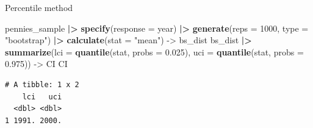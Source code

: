 \documentclass[
  ignorenonframetext,
]{beamer}
\newenvironment{Shaded}{\begin{snugshade}}{\end{snugshade}}
\newcommand{\AttributeTok}[1]{\textcolor[rgb]{0.13,0.29,0.53}{#1}}
\newcommand{\DecValTok}[1]{\textcolor[rgb]{0.00,0.00,0.81}{#1}}
\newcommand{\FloatTok}[1]{\textcolor[rgb]{0.00,0.00,0.81}{#1}}
\newcommand{\FunctionTok}[1]{\textcolor[rgb]{0.13,0.29,0.53}{\textbf{#1}}}
\newcommand{\NormalTok}[1]{#1}
\newcommand{\OtherTok}[1]{\textcolor[rgb]{0.56,0.35,0.01}{#1}}
\newcommand{\SpecialCharTok}[1]{\textcolor[rgb]{0.81,0.36,0.00}{\textbf{#1}}}
\newcommand{\StringTok}[1]{\textcolor[rgb]{0.31,0.60,0.02}{#1}}
\begin{document}
\begin{frame}[fragile]{Percentile method}
\protect\hypertarget{percentile-method}{}
\small

\begin{Shaded}
\begin{Highlighting}[]
\NormalTok{pennies\_sample }\SpecialCharTok{|\textgreater{}} 
  \FunctionTok{specify}\NormalTok{(}\AttributeTok{response =}\NormalTok{ year) }\SpecialCharTok{|\textgreater{}} 
  \FunctionTok{generate}\NormalTok{(}\AttributeTok{reps =} \DecValTok{1000}\NormalTok{, }\AttributeTok{type =} \StringTok{"bootstrap"}\NormalTok{) }\SpecialCharTok{|\textgreater{}} 
  \FunctionTok{calculate}\NormalTok{(}\AttributeTok{stat =} \StringTok{"mean"}\NormalTok{) }\OtherTok{{-}\textgreater{}}\NormalTok{ bs\_dist}
\NormalTok{bs\_dist }\SpecialCharTok{|\textgreater{}} 
  \FunctionTok{summarize}\NormalTok{(}\AttributeTok{lci =} \FunctionTok{quantile}\NormalTok{(stat, }\AttributeTok{probs =} \FloatTok{0.025}\NormalTok{), }
            \AttributeTok{uci =} \FunctionTok{quantile}\NormalTok{(stat, }\AttributeTok{probs =} \FloatTok{0.975}\NormalTok{)) }\OtherTok{{-}\textgreater{}}\NormalTok{ CI}
\NormalTok{CI}
\end{Highlighting}
\end{Shaded}

\begin{verbatim}
# A tibble: 1 x 2
    lci   uci
  <dbl> <dbl>
1 1991. 2000.
\end{verbatim}

\normalsize
\end{frame}
\end{document}
